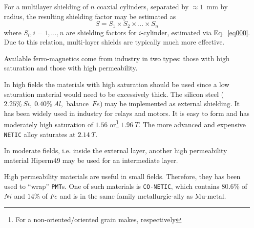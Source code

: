 \documentclass[12pt]{article}
\begin{document}
For a multilayer shielding of $n$ coaxial cylinders, separated by $\approx 1$~mm by radius,
the resulting shielding factor may be estimated as
%
\begin{equation}
S=S_1 \times S_2 \times...\times S_n
\label{eq777}
\end{equation}
%
where $S_i,i=1,...,n$ are shielding factors for
$i$-cylinder,  estimated via Eq.~\ref{eq000}. 
Due to this relation,  multi-layer shields are typically much more effective.

Available ferro-magnetics come from industry in two types: 
those with high saturation and those with high permeability.


In high fields  the  materials with high saturation should be used 
since a low saturation material would need to be excessively thick.
The silicon steel ($2.25\%~Si,~0.40\%~Al$,~balance~$Fe$) may be implemented as 
external shielding. It has been  widely used  in  industry for relays and motors.
It is easy to form and  has moderately high saturation of
 $1.56$ or\footnote{For a non-oriented/oriented grain makes, respectively}
 $1.96~T$.
The more advanced and expensive  {\tt NETIC} alloy saturates at $2.14~T$.

In  moderate fields, i.e. inside the external layer, another  high
permeability material Hiperm49 may be used for an  intermediate layer.

High permeability materials are useful  in small  fields.
Therefore,  they  has been  used to ``wrap'' {\tt PMT}s.  
One of such materials is {\tt CO-NETIC}, which contains $80.6\%$ of  $Ni$ and 
$14\%$  of  $Fe$ and is in the same family metallurgic-ally as Mu-metal. 
\end{document}
